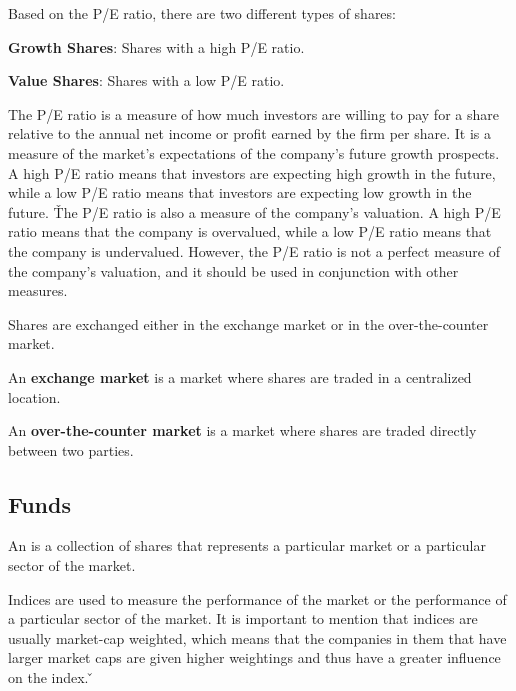 Based on the P/E ratio, there are two different types of shares:
\bit
\item \textbf{Growth Shares}: Shares with a high P/E ratio.
\item \textbf{Value Shares}: Shares with a low P/E ratio.
\eit

The P/E ratio is a measure of how much investors are willing to pay for a share relative to the annual net income or
profit earned by the firm per share. It is a measure of the market's expectations of the company's future growth
prospects. A high P/E ratio means that investors are expecting high growth in the future, while a low P/E ratio means
that investors are expecting low growth in the future. \v

The P/E ratio is also a measure of the company's valuation. A high P/E ratio means that the company is overvalued, while
a low P/E ratio means that the company is undervalued. However, the P/E ratio is not a perfect measure of the company's
valuation, and it should be used in conjunction with other measures.

Shares are exchanged either in the exchange market or in the over-the-counter market.

An \textbf{exchange market} is a market where shares are traded in a centralized location.
\ed

An \textbf{over-the-counter market} is a market where shares are traded directly between two parties.
\ed

\subsection{Funds}

\bd[Index]
An  is a collection of shares that represents a particular market or a particular sector of the market.
\ed

Indices are used to measure the performance of the market or the performance of a particular sector of the market. It
is important to mention that indices are usually market-cap weighted, which means that the companies in them that
have larger market caps are given higher weightings and thus have a greater influence on the index. \v

